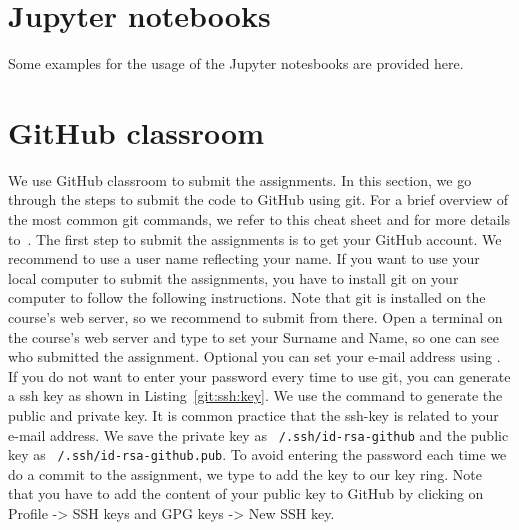 \documentclass[11pt,fleqn]{book} %
\begin{document}
\section*{Jupyter notebooks}

Some examples for the usage of the Jupyter notesbooks are provided here.

\section*{GitHub classroom}

We use GitHub classroom to submit the assignments. In this section, we go through the steps to submit the code to GitHub using git. For a brief overview of the most common git commands, we refer to this cheat sheet and for more details to~\cite{silverman2013git,laster2016professional}. The first step to submit the assignments is to get your GitHub account. We recommend to use a user name reflecting your name. If you want to use your local computer to submit the assignments, you have to install git on your computer to follow the following instructions. Note that git is installed on the course's web server, so we recommend to submit from there. Open a terminal on the course's web server and type  to set your Surname and Name, so one can see who submitted the assignment. Optional you can set your e-mail address using . \\


If you do not want to enter your password every time to use git, you can generate a ssh key as shown in Listing~\ref{git:ssh:key}. We use the command  to generate the public and private key. It is common practice that the ssh-key is related to your e-mail address. We save the private key as \texttt{~/.ssh/id-rsa-github} and the public key as \texttt{~/.ssh/id-rsa-github.pub}. To avoid entering the password each time we do a commit to the assignment, we type  to add the key to our key ring. Note that you have to add the content of your public key to GitHub by clicking on Profile -> SSH keys and GPG keys -> New SSH key. \\
\end{document}
